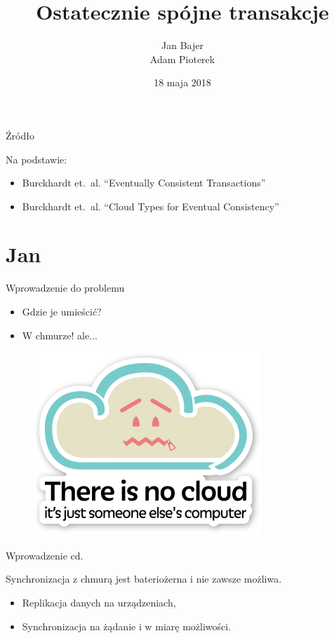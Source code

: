 \documentclass{beamer}
\title{Ostatecznie spójne transakcje}
\date{18 maja 2018}
\author{Jan Bajer\\Adam Pioterek}
\begin{document}
\begin{frame}
\titlepage{}
\end{frame}

\begin{frame}{Źródło}
    \begin{card}
        Na podstawie:
        \begin{itemize}
            \item Burckhardt et.\ al. “Eventually Consistent Transactions”
            \item Burckhardt et.\ al. “Cloud Types for Eventual Consistency”
        \end{itemize}
    \end{card}
\end{frame}

\section{Jan}

\begin{frame}{Wprowadzenie do problemu}
	\begin{card}
		\begin{itemize}[<+->]
			\item Gdzie je umieścić?
			\item W chmurze! ale...
		\end{itemize}
		 {
			\begin{figure}
				\centering
				\includegraphics[width=.5\textwidth]{no_cloud.png}
			\end{figure}
		}
	\end{card}
\end{frame}

\begin{frame}{Wprowadzenie cd.}
	\begin{card}
		Synchronizacja z chmurą jest bateriożerna i nie zawsze możliwa.
	\end{card}
	 {
		\begin{card}[Rozwiązanie?]
			\begin{itemize}
				\item Replikacja danych na urządzeniach, 
				\item Synchronizacja na żądanie i w miarę możliwości.
			\end{itemize}
		\end{card}
	}
\end{frame}
\end{document}
